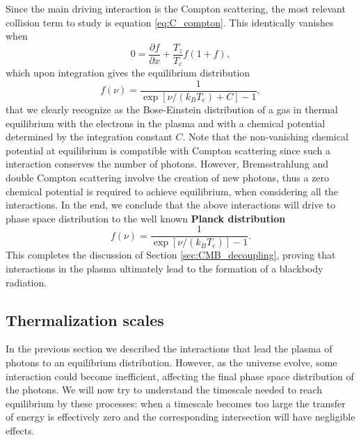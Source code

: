 Since the main driving interaction is the Compton scattering, the most relevant collision term to study is equation \eqref{eq:C_compton}. This identically vanishes when
$$0=\frac{\partial f}{\partial x}+\frac{T_z}{T_e}f(1+f),$$
which upon integration gives the equilibrium distribution
$$f(\nu)=\frac{1}{\exp[\nu/(k_BT_e)+C]-1},$$
that we clearly recognize as the Bose-Einstein distribution of a gas in thermal equilibrium with the electrons in the plasma and with a chemical potential determined by the integration constant  $C$. Note that the non-vanishing chemical potential at equilibrium is compatible with Compton scattering since such a interaction conserves the number of photons. However, Bremsstrahlung and double Compton scattering involve the creation of new photons, thus a zero chemical potential is required to achieve equilibrium, when considering all the interactions. In the end, we conclude that the above interactions will drive to phase space distribution to the well known \textbf{Planck distribution}
$$f(\nu)=\frac{1}{\exp[\nu/(k_BT_e)]-1}.$$
This completes the discussion of Section \ref{sec:CMB_decoupling}, proving that interactions in the plasma ultimately lead to the formation of a blackbody radiation.
\subsection{Thermalization scales}
\label{sec:ThermalizationScales}
In the previous section we described the interactions that lead the plasma of photons to an equilibrium distribution. However, as the universe evolve, some interaction could become inefficient, affecting the final phase space distribution of the photons. We will now try to understand the timescale needed to reach equilibrium by these processes: when a timescale becomes too large the transfer of energy is effectively zero and the corresponding intersection will have negligible effects.

